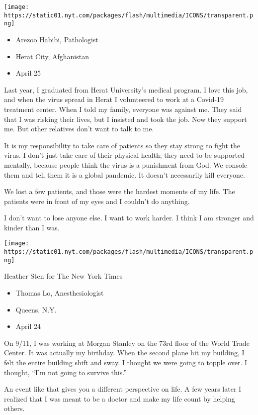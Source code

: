 \texttt{[image: https://static01.nyt.com/packages/flash/multimedia/ICONS/transparent.png]}

\begin{itemize}
\tightlist
\item
  Arezoo Habibi, Pathologist
\item
  Herat City, Afghanistan
\item
  April 25
\end{itemize}

Last year, I graduated from Herat University's medical program. I love
this job, and when the virus spread in Herat I volunteered to work at a
Covid-19 treatment center. When I told my family, everyone was against
me. They said that I was risking their lives, but I insisted and took
the job. Now they support me. But other relatives don't want to talk to
me.

It is my responsibility to take care of patients so they stay strong to
fight the virus. I don't just take care of their physical health; they
need to be supported mentally, because people think the virus is a
punishment from God. We console them and tell them it is a global
pandemic. It doesn't necessarily kill everyone.

We lost a few patients, and those were the hardest moments of my life.
The patients were in front of my eyes and I couldn't do anything.

I don't want to lose anyone else. I want to work harder. I think I am
stronger and kinder than I was.

\texttt{[image: https://static01.nyt.com/packages/flash/multimedia/ICONS/transparent.png]}

Heather Sten for The New York Times

\begin{itemize}
\tightlist
\item
  Thomas Lo, Anesthesiologist
\item
  Queens, N.Y.
\item
  April 24
\end{itemize}

On 9/11, I was working at Morgan Stanley on the 73rd floor of the World
Trade Center. It was actually my birthday. When the second plane hit my
building, I felt the entire building shift and sway. I thought we were
going to topple over. I thought, ``I'm not going to survive this.''

An event like that gives you a different perspective on life. A few
years later I realized that I was meant to be a doctor and make my life
count by helping others.

